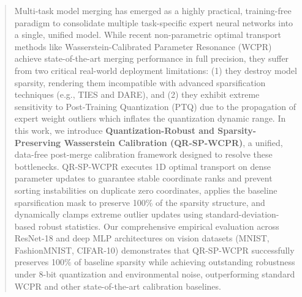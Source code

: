 \documentclass{article}
\theoremstyle{plain}
\theoremstyle{definition}
\theoremstyle{remark}
\begin{document}

\printAffiliationsAndNotice{}

\begin{abstract}
Multi-task model merging has emerged as a highly practical, training-free paradigm to consolidate multiple task-specific expert neural networks into a single, unified model. While recent non-parametric optimal transport methods like Wasserstein-Calibrated Parameter Resonance (WCPR) achieve state-of-the-art merging performance in full precision, they suffer from two critical real-world deployment limitations: (1) they destroy model sparsity, rendering them incompatible with advanced sparsification techniques (e.g., TIES and DARE), and (2) they exhibit extreme sensitivity to Post-Training Quantization (PTQ) due to the propagation of expert weight outliers which inflates the quantization dynamic range. 
In this work, we introduce \textbf{Quantization-Robust and Sparsity-Preserving Wasserstein Calibration (QR-SP-WCPR)}, a unified, data-free post-merge calibration framework designed to resolve these bottlenecks. QR-SP-WCPR executes 1D optimal transport on dense parameter updates to guarantee stable coordinate ranks and prevent sorting instabilities on duplicate zero coordinates, applies the baseline sparsification mask to preserve 100\% of the sparsity structure, and dynamically clamps extreme outlier updates using standard-deviation-based robust statistics. 
Our comprehensive empirical evaluation across ResNet-18 and deep MLP architectures on vision datasets (MNIST, FashionMNIST, CIFAR-10) demonstrates that QR-SP-WCPR successfully preserves 100\% of baseline sparsity while achieving outstanding robustness under 8-bit quantization and environmental noise, outperforming standard WCPR and other state-of-the-art calibration baselines.
\end{abstract}
\end{document}
